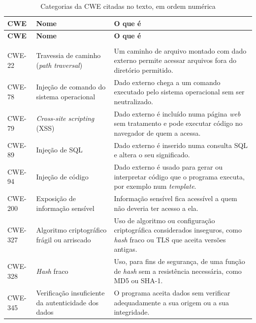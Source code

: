\begin{apendicesenv}
{\renewcommand{\arraystretch}{1.2}\setlength{\LTpost}{2pt}
\begin{longtable}{|>{\footnotesize}l|>{\footnotesize\raggedright\arraybackslash}p{4.3cm}|>{\footnotesize\raggedright\arraybackslash}p{8.4cm}|}
    \caption[Categorias da CWE citadas no texto]{Categorias da CWE citadas no texto, em ordem numérica}
    \label{tab:cwes} \\
        \hline
        \textbf{CWE} & \textbf{Nome} & \textbf{O que é} \\
        \hline
    \endfirsthead
        \hline
        \textbf{CWE} & \textbf{Nome} & \textbf{O que é} \\
        \hline
    \endhead
        \multicolumn{3}{r}{\footnotesize continua na próxima página} \\
    \endfoot
    \endlastfoot
        CWE-22 & Travessia de caminho (\textit{path traversal}) & Um caminho de arquivo montado com dado externo permite acessar arquivos fora do diretório permitido. \\
        \hline
        CWE-78 & Injeção de comando do sistema operacional & Dado externo chega a um comando executado pelo sistema operacional sem ser neutralizado. \\
        \hline
        CWE-79 & \textit{Cross-site scripting} (XSS) & Dado externo é incluído numa página \textit{web} sem tratamento e pode executar código no navegador de quem a acessa. \\
        \hline
        CWE-89 & Injeção de SQL & Dado externo é inserido numa consulta SQL e altera o seu significado. \\
        \hline
        CWE-94 & Injeção de código & Dado externo é usado para gerar ou interpretar código que o programa executa, por exemplo num \textit{template}. \\
        \hline
        CWE-200 & Exposição de informação sensível & Informação sensível fica acessível a quem não deveria ter acesso a ela. \\
        \hline
        CWE-327 & Algoritmo criptográfico frágil ou arriscado & Uso de algoritmo ou configuração criptográfica considerados inseguros, como \textit{hash} fraco ou TLS que aceita versões antigas. \\
        \hline
        CWE-328 & \textit{Hash} fraco & Uso, para fins de segurança, de uma função de \textit{hash} sem a resistência necessária, como MD5 ou SHA-1. \\
        \hline
        CWE-345 & Verificação insuficiente da autenticidade dos dados & O programa aceita dados sem verificar adequadamente a sua origem ou a sua integridade. \\

\end{longtable}}
\end{apendicesenv}
